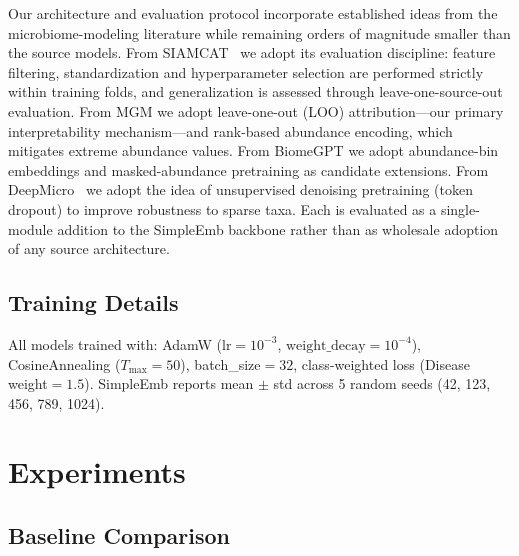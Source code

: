 \documentclass[11pt,a4paper]{article}
\begin{document}
Our architecture and evaluation protocol incorporate established ideas from the microbiome-modeling literature while remaining orders of magnitude smaller than the source models. From SIAMCAT~\cite{siamcat2021} we adopt its evaluation discipline: feature filtering, standardization and hyperparameter selection are performed strictly within training folds, and generalization is assessed through leave-one-source-out evaluation. From MGM we adopt leave-one-out (LOO) attribution---our primary interpretability mechanism---and rank-based abundance encoding, which mitigates extreme abundance values. From BiomeGPT we adopt abundance-bin embeddings and masked-abundance pretraining as candidate extensions. From DeepMicro~\cite{deepmicro2020} we adopt the idea of unsupervised denoising pretraining (token dropout) to improve robustness to sparse taxa. Each is evaluated as a single-module addition to the SimpleEmb backbone rather than as wholesale adoption of any source architecture.

\subsection{Training Details}

All models trained with: AdamW ($\text{lr}{=}10^{-3}$, $\text{weight\_decay}{=}10^{-4}$), CosineAnnealing ($T_{\max}{=}50$), batch\_size${=}32$, class-weighted loss (Disease weight${=}1.5$). SimpleEmb reports mean $\pm$ std across 5 random seeds (42, 123, 456, 789, 1024).

\section{Experiments}

\subsection{Baseline Comparison}
\label{sec:baseline}
\end{document}
